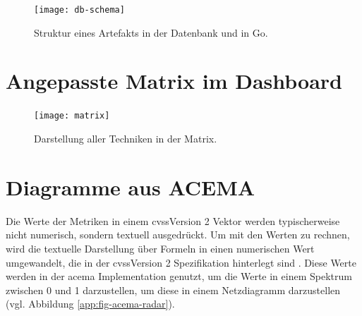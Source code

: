 \begin{figure}[!htb]
    \centering
    \texttt{[image: db-schema]}
    \caption{Struktur eines Artefakts in der Datenbank und in Go.}
\end{figure}

\chapter{Angepasste Matrix im Dashboard}
\label{app:matrix}
\begin{figure}[!htb]
    \centering
    \texttt{[image: matrix]}
    \caption{Darstellung aller Techniken in der Matrix.}
\end{figure}

\chapter{Diagramme aus ACEMA}
\label{app:acema-diagrams}
Die Werte der Metriken in einem \gls{cvss}Version 2 Vektor werden typischerweise nicht numerisch, sondern textuell ausgedrückt. Um mit den Werten zu rechnen, wird die textuelle Darstellung über Formeln in einen numerischen Wert umgewandelt, die in der \gls{cvss}Version 2 Spezifikation hinterlegt sind \autocite{CVSSV2Complete}. Diese Werte werden in der \gls{acema} Implementation genutzt, um die Werte in einem Spektrum zwischen 0 und 1 darzustellen, um diese in einem Netzdiagramm darzustellen (vgl. Abbildung \ref{app:fig-acema-radar}).
